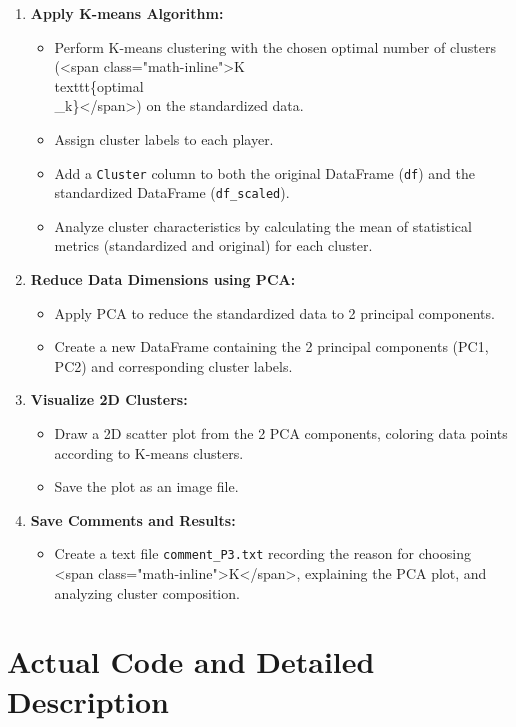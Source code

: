 \documentclass[12pt]{report}
\begin{document}
{{{\begin{enumerate}
	\item \textbf{Apply K-means Algorithm:} %
\begin{itemize}
  \item Perform K-means clustering with the chosen optimal number of clusters (<span class="math-inline">K \= \\texttt\{optimal\\\_k\}</span>) on the standardized data.
  \item Assign cluster labels to each player.
  \item Add a \texttt{Cluster} column to both the original DataFrame (\texttt{df}) and the standardized DataFrame (\texttt{df\_scaled}).
  \item Analyze cluster characteristics by calculating the mean of statistical metrics (standardized and original) for each cluster.
\end{itemize}

	\item \textbf{Reduce Data Dimensions using PCA:} %
\begin{itemize}
  \item Apply PCA to reduce the standardized data to 2 principal components.
  \item Create a new DataFrame containing the 2 principal components (PC1, PC2) and corresponding cluster labels.
\end{itemize}

	\item \textbf{Visualize 2D Clusters:} %
\begin{itemize}
  \item Draw a 2D scatter plot from the 2 PCA components, coloring data points according to K-means clusters.
  \item Save the plot as an image file.
\end{itemize}
	\item \textbf{Save Comments and Results:} %
\begin{itemize}
  \item Create a text file \texttt{comment\_P3.txt} recording the reason for choosing <span class="math-inline">K</span>, explaining the PCA plot, and analyzing cluster composition.
\end{itemize}
\end{enumerate}
\section{Actual Code and Detailed Description} %
}}}
\end{document}

